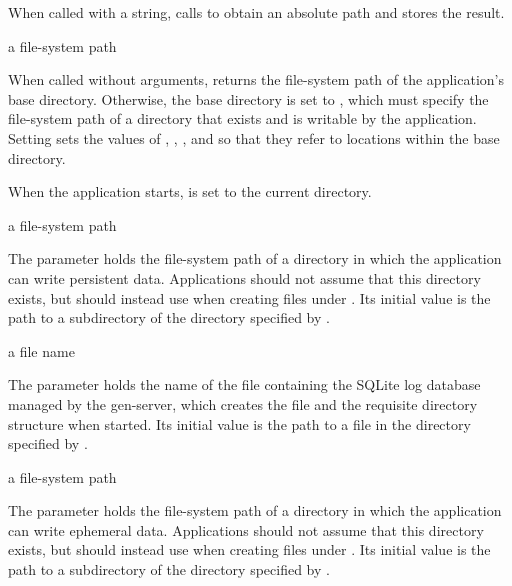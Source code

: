 When called with a string,  calls  to
obtain an absolute path and stores the result.

\begin{parameter}
\end{parameter}
\hasvalue{} a file-system path

When called without arguments,  returns the file-system path of
the application's base directory.
Otherwise, the base directory is set to , which must specify the
file-system path of a directory that exists and is writable by the application.
Setting  sets the values of , ,
, and  so that they refer to locations within the
base directory.

When the application starts,  is set to the current directory.

\begin{parameter}
\end{parameter}
\hasvalue{} a file-system path

The  parameter holds the file-system path of a directory
in which the application can write persistent data.
Applications should not assume that this directory exists, but should
instead use  when creating files under .
Its initial value is the path to a  subdirectory of
the directory specified by .

\begin{parameter}
\end{parameter}
\hasvalue{} a file name

The  parameter holds the name of the file containing the SQLite
log database managed by the  gen-server, which creates the file
and the requisite directory structure when started.
Its initial value is the path to a  file in the directory
specified by .

\begin{parameter}
\end{parameter}
\hasvalue{} a file-system path

The  parameter holds the file-system path of a directory
in which the application can write ephemeral data.
Applications should not assume that this directory exists, but should
instead use  when creating files under .
Its initial value is the path to a  subdirectory of
the directory specified by .

